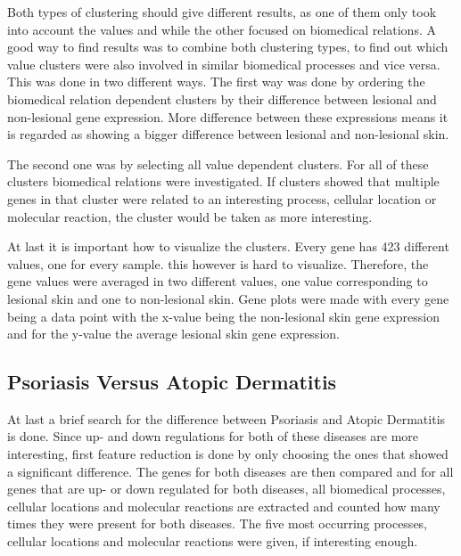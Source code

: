 \documentclass[10pt,a4paper]{article}
\begin{document}
	Both types of clustering should give different results, as one of them only took into account the values and while the other focused on biomedical relations. A good way to find results was to combine both clustering types, to find out which value clusters were also involved in similar biomedical processes and vice versa. This was done in two different ways. The first way was done by ordering the biomedical relation dependent clusters by their difference between lesional and non-lesional gene expression. More difference between these expressions means it is regarded as showing a bigger difference between lesional and non-lesional skin.
	
	The second one was by selecting all value dependent clusters. For all of these clusters biomedical relations were investigated. If clusters showed that multiple genes in that cluster were related to an interesting process, cellular location or molecular reaction, the cluster would be taken as more interesting.
	
	At last it is important how to visualize the clusters. Every gene has 423 different values, one for every sample. this however is hard to visualize. Therefore, the gene values were averaged in two different values, one value corresponding to lesional skin and one to non-lesional skin. Gene plots were made with every gene being a data point with the x-value being the non-lesional skin gene expression and for the y-value the average lesional skin gene expression.
	
	\subsection{Psoriasis Versus Atopic Dermatitis}
	\label{subsec:MethodsPsoriasisVersusAtopicDermatitis}
	
	At last a brief search for the difference between Psoriasis and Atopic Dermatitis is done. Since up- and down regulations for both of these diseases are more interesting, first feature reduction is done by only choosing the ones that showed a significant difference. The genes for both diseases are then compared and for all genes that are up- or down regulated for both diseases, all biomedical processes, cellular locations and molecular reactions are extracted and counted how many times they were present for both diseases. The five most occurring processes, cellular locations and molecular reactions were given, if interesting enough.
	
\end{document}
